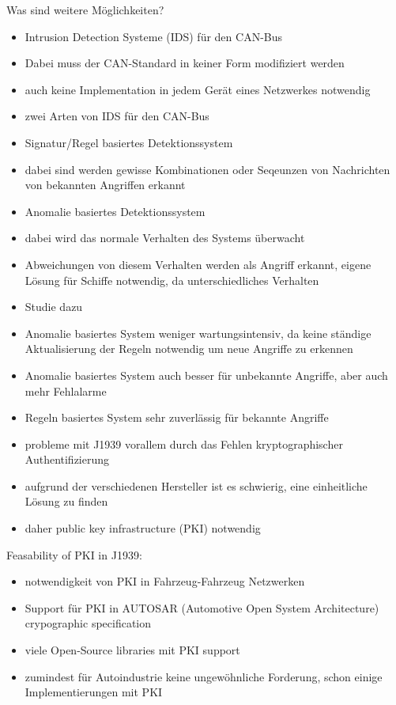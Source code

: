 Was sind weitere Möglichkeiten?
\begin{itemize}
    \item Intrusion Detection Systeme (IDS) für den CAN-Bus
    \item Dabei muss der CAN-Standard in keiner Form modifiziert werden
    \item auch keine Implementation in jedem Gerät eines Netzwerkes notwendig
\end{itemize}
\cite{Gmiden2016}
\begin{itemize}
    \item zwei Arten von IDS für den CAN-Bus
    \item Signatur/Regel basiertes Detektionssystem
    \item dabei sind werden gewisse Kombinationen oder Seqeunzen von Nachrichten von bekannten Angriffen erkannt
    \item Anomalie basiertes Detektionssystem
    \item dabei wird das normale Verhalten des Systems überwacht
    \item Abweichungen von diesem Verhalten werden als Angriff erkannt, eigene Lösung für Schiffe notwendig, da unterschiedliches Verhalten
    \item Studie dazu \cite{Davieds2024}
    \item Anomalie basiertes System weniger wartungsintensiv, da keine ständige Aktualisierung der Regeln notwendig um neue Angriffe zu erkennen
    \item Anomalie basiertes System auch besser für unbekannte Angriffe, aber auch mehr Fehlalarme
    \item Regeln basiertes System sehr zuverlässig für bekannte Angriffe
\end{itemize}
\cite{Hoppe2009}

\begin{itemize}
    \item probleme mit J1939 vorallem durch das Fehlen kryptographischer Authentifizierung
    \item aufgrund der verschiedenen Hersteller ist es schwierig, eine einheitliche Lösung zu finden
    \item daher public key infrastructure (PKI) notwendig
\end{itemize}
\cite{Murvay2018}
Feasability of PKI in J1939:
\begin{itemize}
    \item notwendigkeit von PKI in Fahrzeug-Fahrzeug Netzwerken
    \item Support für PKI in AUTOSAR (Automotive Open System Architecture) crypographic specification
    \item viele Open-Source libraries mit PKI support
    \item zumindest für Autoindustrie keine ungewöhnliche Forderung, schon einige Implementierungen mit PKI
\end{itemize}
\cite{Murvay2018}
